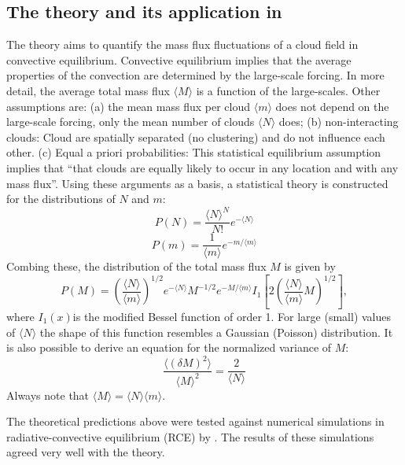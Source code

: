 \documentclass[a4paper, 12pt]{article}
\begin{document}
\subsection{The \cite{Craig2006} theory and its application in \cite{Plant2008}} 
The \cite[][CC06]{Craig2006} theory aims to quantify the mass flux fluctuations of a cloud field in convective equilibrium. Convective equilibrium implies that the average properties of the convection are determined by the large-scale forcing. In more detail, the average total mass flux $\langle M \rangle$ is a function of the large-scales. Other assumptions are: (a) the mean mass flux per cloud $\langle m \rangle$ does not depend on the large-scale forcing, only the mean number of clouds $\langle N \rangle$ does; (b) non-interacting clouds: Cloud are spatially separated (no clustering) and do not influence each other. (c) Equal a priori probabilities: This statistical equilibrium assumption implies that ``that clouds are equally likely to occur in any location and with any mass flux''. Using these arguments as a basis, a statistical theory is constructed for the distributions of $N$ and $m$:
\begin{equation} \label{eq:N_dist}
 P(N) = \frac{\langle N \rangle^N}{N!}e^{-\langle N \rangle}
\end{equation}
\begin{equation} \label{eq:m_dist}
 P(m) = \frac{1}{\langle m \rangle}e^{-m/\langle m \rangle}
\end{equation}
Combing these, the distribution of the total mass flux $M$ is given by
\begin{equation} \label{eq:M_dist}
 P(M) = \left( \frac{\langle N \rangle}{\langle m \rangle} \right)^{1/2} e^{-\langle N \rangle} M^{-1/2} e^{-M/\langle m \rangle} I_1\left[ 2 \left( \frac{\langle N \rangle}{\langle m \rangle} M \right)^{1/2} \right],
\end{equation}
where $I_1(x)$is the modified Bessel function of order 1. For large (small) values of $\langle N \rangle$ the shape of this function resembles a Gaussian (Poisson) distribution.   
It is also possible to derive an equation for the normalized variance of $M$:
\begin{equation} \label{eq:M_var}
 \frac{\langle (\delta M)^2 \rangle}{\langle M \rangle^2} = \frac{2}{\langle N \rangle}
\end{equation}
Always note that $\langle M \rangle = \langle N \rangle \langle m \rangle$.

The theoretical predictions above were tested against numerical simulations in radiative-convective equilibrium (RCE) by \cite{Cohen2006}. The results of these simulations agreed very well with the theory.
\end{document}
